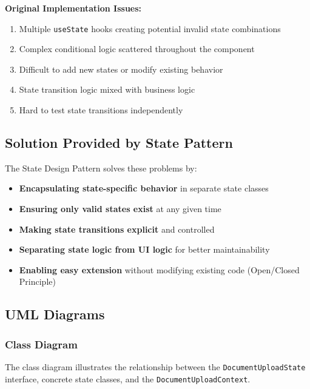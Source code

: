 \documentclass[11pt,a4paper]{article}
\begin{document}
\textbf{Original Implementation Issues:}
\begin{enumerate}
    \item Multiple \texttt{useState} hooks creating potential invalid state combinations
    \item Complex conditional logic scattered throughout the component
    \item Difficult to add new states or modify existing behavior
    \item State transition logic mixed with business logic
    \item Hard to test state transitions independently
\end{enumerate}

\subsection{Solution Provided by State Pattern}

The State Design Pattern solves these problems by:
\begin{itemize}
    \item \textbf{Encapsulating state-specific behavior} in separate state classes
    \item \textbf{Ensuring only valid states exist} at any given time
    \item \textbf{Making state transitions explicit} and controlled
    \item \textbf{Separating state logic from UI logic} for better maintainability
    \item \textbf{Enabling easy extension} without modifying existing code (Open/Closed Principle)
\end{itemize}

\subsection{UML Diagrams}

\subsubsection{Class Diagram}

The class diagram illustrates the relationship between the \texttt{DocumentUploadState} interface, concrete state classes, and the \texttt{DocumentUploadContext}.
\end{document}
